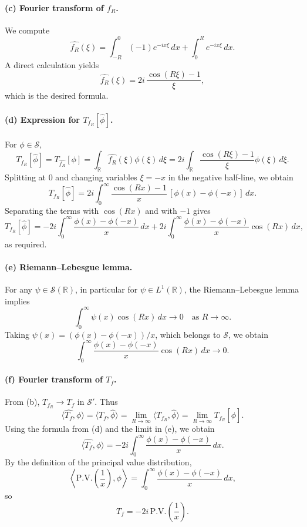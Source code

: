 \documentclass[12pt,a4paper]{article}
\theoremstyle{plain}
\theoremstyle{definition}
\theoremstyle{remark}
\theoremstyle{remark}
\begin{document}
\paragraph{(c) Fourier transform of $f_R$.}
We compute
\[
\widehat{f_R}(\xi)
= \int_{-R}^{0} (-1)e^{-ix\xi}\,dx + \int_{0}^{R} e^{-ix\xi}\,dx.
\]
A direct calculation yields
\[
\widehat{f_R}(\xi)
= 2i\,\frac{\cos(R\xi)-1}{\xi},
\]
which is the desired formula.

\paragraph{(d) Expression for $T_{f_R}[\widehat{\phi}]$.}
For $\phi\in\mathcal{S}$,
\[
T_{f_R}[\widehat{\phi}]
= T_{\widehat{f_R}}[\phi]
= \int_{\mathbb{R}} \widehat{f_R}(\xi)\phi(\xi)\,d\xi
= 2i\int_{\mathbb{R}} \frac{\cos(R\xi)-1}{\xi}\phi(\xi)\,d\xi.
\]
Splitting at $0$ and changing variables $\xi=-x$ in the negative half-line,
we obtain
\[
T_{f_R}[\widehat{\phi}]
= 2i\int_0^{\infty} \frac{\cos(Rx)-1}{x}\,[\phi(x)-\phi(-x)]\,dx.
\]
Separating the terms with $\cos(Rx)$ and with $-1$ gives
\[
T_{f_R}[\widehat{\phi}]
= -2i\int_0^{\infty} \frac{\phi(x)-\phi(-x)}{x}\,dx
+ 2i\int_0^{\infty} \frac{\phi(x)-\phi(-x)}{x}\cos(Rx)\,dx,
\]
as required.

\paragraph{(e) Riemann--Lebesgue lemma.}
For any $\psi\in\mathcal{S}(\mathbb{R})$, in particular for
$\psi\in L^{1}(\mathbb{R})$, the Riemann--Lebesgue lemma implies
\[
\int_0^{\infty} \psi(x)\cos(Rx)\,dx \to 0
\quad\text{as } R\to\infty.
\]
Taking $\psi(x)=(\phi(x)-\phi(-x))/x$, which belongs to $\mathcal{S}$, we
obtain
\[
\int_0^{\infty} \frac{\phi(x)-\phi(-x)}{x}\cos(Rx)\,dx \to 0.
\]

\paragraph{(f) Fourier transform of $T_f$.}
From (b),
$T_{f_R}\to T_f$ in $\mathcal{S}'$.  Thus
\[
\langle \widehat{T_f},\phi\rangle
= \langle T_f,\widehat{\phi}\rangle
= \lim_{R\to\infty} \langle T_{f_R},\widehat{\phi}\rangle
= \lim_{R\to\infty} T_{f_R}[\widehat{\phi}].
\]
Using the formula from (d) and the limit in (e), we obtain
\[
\langle \widehat{T_f},\phi\rangle
= -2i\int_0^{\infty} \frac{\phi(x)-\phi(-x)}{x}\,dx.
\]
By the definition of the principal value distribution,
\[
\left\langle \mathrm{P.V.}\left(\frac{1}{x}\right),\phi\right\rangle
= \int_0^{\infty} \frac{\phi(x)-\phi(-x)}{x}\,dx,
\]
so
\[
\widehat{T_f}
= -2i\,\mathrm{P.V.}\left(\frac{1}{x}\right).
\]
\end{document}

